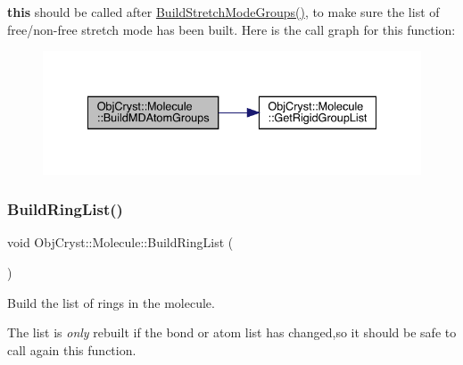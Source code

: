 {\bfseries{this}} should be called after \mbox{\hyperlink{class_obj_cryst_1_1_molecule_a83b7b9bac2ce9fe7b310b5267232b1ca}{Build\+Stretch\+Mode\+Groups()}}, to make sure the list of free/non-\/free stretch mode has been built. Here is the call graph for this function\+:
\nopagebreak
\begin{figure}[H]
\begin{center}
\leavevmode
\includegraphics[width=335pt]{class_obj_cryst_1_1_molecule_a0944a68727d85bee4ec0cce453cb451c_cgraph}
\end{center}
\end{figure}
\mbox{\label{class_obj_cryst_1_1_molecule_a9623bff2259d45c162ed28af73974f5a}} 
\subsubsection{\texorpdfstring{BuildRingList()}{BuildRingList()}}
{\footnotesize\ttfamily void Obj\+Cryst\+::\+Molecule\+::\+Build\+Ring\+List (\begin{DoxyParamCaption}{ }\end{DoxyParamCaption})}

Build the list of rings in the molecule.

The list is {\itshape only} rebuilt if the bond or atom list has changed,so it should be safe to call again this function.

